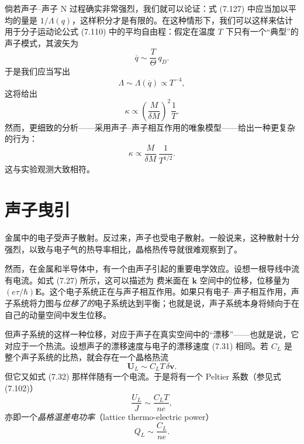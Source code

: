 倘若声子--声子 N 过程确实非常强烈，我们就可以论证：式 (7.127) 中应当加以平均的量是 $1/\Lambda(q)$，这样积分才是有限的。在这种情形下，我们可以这样来估计用于分子运动论公式 (7.110) 中的平均自由程：假定在温度 $T$ 下只有一个“典型”的声子模式，其波矢为
\begin{equation*}
\overline{q}\sim\frac{T}{\Theta}\,q_{D}.\tag{7.129}
\end{equation*}
于是我们应当写出
\begin{equation*}
\Lambda\sim\Lambda(\overline{q})\propto T^{-4},\tag{7.130}
\end{equation*}
这将给出
\begin{equation*}
\kappa\propto\left(\frac{M}{\delta M}\right)^{2}\frac{1}{T}.\tag{7.131}
\end{equation*}
然而，更细致的分析——采用声子--声子相互作用的唯象模型——给出一种更复杂的行为：
\begin{equation*}
\kappa\propto\frac{M}{\delta M}\,\frac{1}{T^{1/2}}.\tag{7.132}
\end{equation*}
这与实验观测大致相符。

\section{声子曳引}

金属中的电子受声子散射。反过来，声子也受电子散射。一般说来，这种散射十分强烈，以致与电子气的热导率相比，晶格热传导就很难观察到了。

然而，在金属和半导体中，有一个由声子引起的重要电学效应。设想一根导线中流有电流。如式 (7.27) 所示，这可以描述为 费米面在 $\mathbf{k}$ 空间中的位移，位移量为 $(e\tau/\hbar)\mathbf{E}$。这个电子系统正在与声子相互作用。如果只有电子--声子相互作用，声子系统将力图与\emph{位移了的}电子系统达到平衡；也就是说，声子系统本身将倾向于在自己的动量空间中发生位移。

但声子系统的这样一种位移，对应于声子在真实空间中的“漂移”——也就是说，它对应于一个热流。设想声子的漂移速度与电子的漂移速度 (7.31) 相同。若 $C_{L}$ 是整个声子系统的比热，就会存在一个晶格热流
\begin{equation*}
\mathbf{U}_{L}\sim C_{L}T\,\delta\mathbf{v}.\tag{7.133}
\end{equation*}
但它又如式 (7.32) 那样伴随有一个电流。于是将有一个 Peltier 系数（参见式 (7.102)）
\begin{equation*}
\frac{U_{L}}{J}\sim\frac{C_{L}T}{ne},\tag{7.134}
\end{equation*}
亦即一个\emph{晶格温差电功率}（lattice thermo-electric power）
\begin{equation*}
Q_{L}\sim\frac{C_{L}}{ne}.\tag{7.135}
\end{equation*}

